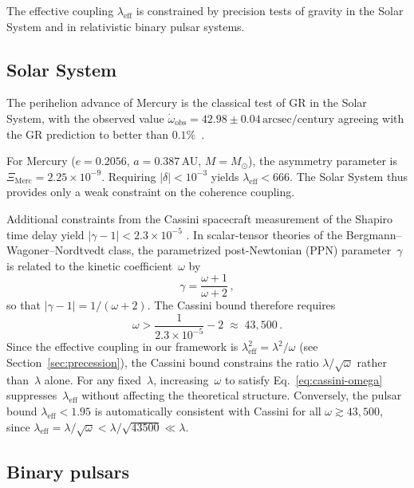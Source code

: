 \documentclass[showpacs,preprintnumbers,amsmath,amssymb,prd,longbibliography]{revtex4-2}
\begin{document}
The effective coupling $\lambda_{\mathrm{eff}}$ is constrained
by precision tests of gravity in the Solar System and in
relativistic binary pulsar systems.

\subsection{Solar System}

The perihelion advance of Mercury is the classical test of
GR in the Solar System, with the observed value
$\dot\omega_{\mathrm{obs}} = 42.98 \pm 0.04\,\mathrm{arcsec/century}$
agreeing with the GR prediction to better than
$0.1\%$~\cite{Will2014,Pitjeva2014}.

For Mercury ($e = 0.2056$, $a = 0.387\,$AU, $M = M_\odot$),
the asymmetry parameter is
$\Xi_{\mathrm{Merc}} = 2.25 \times 10^{-9}$.
Requiring $|\delta| < 10^{-3}$ yields
$\lambda_{\mathrm{eff}} < 666$.
The Solar System thus provides only a weak constraint on the
coherence coupling.

Additional constraints from the Cassini spacecraft measurement
of the Shapiro time delay yield $|\gamma - 1| < 2.3\times 10^{-5}$
\cite{Bertotti2003}.
In scalar-tensor theories of the Bergmann--Wagoner--Nordtvedt class,
the parametrized post-Newtonian (PPN) parameter~$\gamma$ is
related to the kinetic coefficient~$\omega$ by
\begin{equation}
\gamma = \frac{\omega + 1}{\omega + 2}\,,
\label{eq:ppn-gamma}
\end{equation}
so that
$|\gamma - 1| = 1/(\omega + 2)$.
The Cassini bound therefore requires
\begin{equation}
\omega > \frac{1}{2.3\times10^{-5}} - 2 \;\approx\; 43{,}500\,.
\label{eq:cassini-omega}
\end{equation}
Since the effective coupling in our framework is
$\lambda_{\mathrm{eff}}^2 = \lambda^2/\omega$
(see Section~\ref{sec:precession}), the Cassini bound
constrains the ratio $\lambda/\sqrt{\omega}$ rather
than~$\lambda$ alone.
For any fixed~$\lambda$, increasing~$\omega$ to satisfy
Eq.~\eqref{eq:cassini-omega} suppresses~$\lambda_{\mathrm{eff}}$
without affecting the theoretical structure.
Conversely, the pulsar bound
$\lambda_{\mathrm{eff}} < 1.95$ is automatically consistent
with Cassini for all $\omega \gtrsim 43{,}500$, since
$\lambda_{\mathrm{eff}} = \lambda/\sqrt{\omega}
< \lambda/\sqrt{43500} \ll \lambda$.

\subsection{Binary pulsars}
\label{subsec:pulsars}
\end{document}
